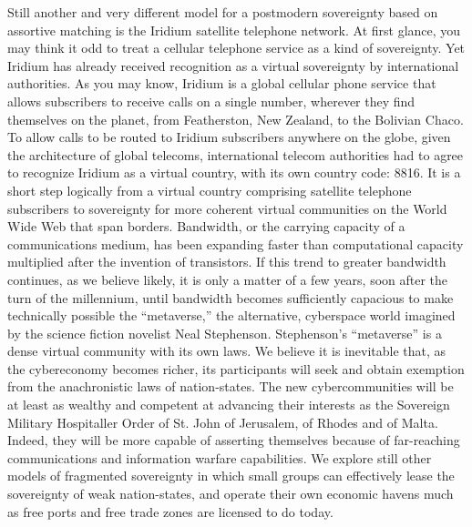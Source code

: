 \begin{paracol}{2}[]
	\switchcolumn*
	Still another and very different model for a postmodern sovereignty based on assortive matching is the Iridium satellite telephone network. At first glance, you may think it odd to treat a cellular telephone service as a kind of sovereignty. Yet Iridium has already received recognition as a virtual sovereignty by international authorities. As you may know, Iridium is a global cellular phone service that allows subscribers to receive calls on a single number, wherever they find themselves on the planet, from Featherston, New Zealand, to the Bolivian Chaco. To allow calls to be routed to Iridium subscribers anywhere on the globe, given the architecture of global telecoms, international telecom authorities had to agree to recognize Iridium as a virtual country, with its own country code: 8816. It is a short step logically from a virtual country comprising satellite telephone subscribers to sovereignty for more coherent virtual communities on the World Wide Web that span borders. Bandwidth, or the carrying capacity of a communications medium, has been expanding faster than computational capacity multiplied after the invention of transistors. If this trend to greater bandwidth continues, as we believe likely, it is only a matter of a few years, soon after the turn of the millennium, until bandwidth becomes sufficiently capacious to make technically possible the ``metaverse,'' the alternative, cyberspace world imagined by the science fiction novelist Neal Stephenson. Stephenson's ``metaverse'' is a dense virtual community with its own laws. We believe it is inevitable that, as the cybereconomy becomes richer, its participants will seek and obtain exemption from the anachronistic laws of nation-states. The new cybercommunities will be at least as wealthy and competent at advancing their interests as the Sovereign Military Hospitaller Order of St. John of Jerusalem, of Rhodes and of Malta. Indeed, they will be more capable of asserting themselves because of far-reaching communications and information warfare capabilities. We explore still other models of fragmented sovereignty in which small groups can effectively lease the sovereignty of weak nation-states, and operate their own economic havens much as free ports and free trade zones are licensed to do today.
	

\end{paracol}
